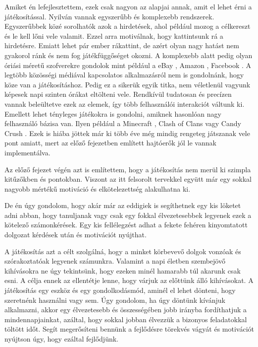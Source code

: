 


Amiket én lefejlesztettem, ezek csak nagyon az alapjai annak, amit el lehet érni a játékosítással. Nyilván vannak egyszerűbb és komplexebb rendszerek. Egyszerűbbek közé sorolhatók azok a hirdetések, ahol például mozog a célkereszt és le kell lőni vele valamit. Ezzel arra motiválnak, hogy kattintsunk rá a hirdetésre. Emiatt lehet pár ember rákattint, de azért olyan nagy hatást nem gyakorol ránk és nem fog játékfüggőséget okozni. A komplexebb alatt pedig olyan óriási méretű szofverekre gondolok mint például a eBay \cite{ebay}, Amazon \cite{amazon}, Facebook \cite{facebook}. A legtöbb közösségi médiával kapcsolatos alkalmazásról nem is gondolnánk, hogy köze van a játékosításhoz. Pedig ez a sikerük egyik titka, nem véletlenül vagyunk képesek napi szinten órákat eltölteni vele. Rendkívül tudatosan és precízen vannak beleültetve ezek az elemek, így több felhasználói interakciót váltunk ki. Emellett lehet tényleges játékokra is gondolni, amiknek hasonlóan nagy felhasználó bázisa van. Ilyen például a Minecraft \cite{minecraft}, Clash of Clans \cite{clashOfClans} vagy Candy Crush \cite{candycrush}. Ezek is hiába jöttek már ki több éve még mindig rengeteg játszanak vele pont amiatt, mert az előző fejezetben említett hajtóerők jól le vannak implementálva. \newline

Az előző fejezet végén azt is említettem, hogy a játékosítás nem merül ki szimpla kitűzőkben és pontokban. Viszont az itt felsorolt tervekkel együtt már egy sokkal nagyobb mértékű motiváció és elkötelezettség alakulhatna ki. \newline

De én úgy gondolom, hogy akár már az eddigiek is segíthetnek egy kis löketet adni abban, hogy tanuljanak vagy csak egy fokkal élvezetesebbek legyenek ezek a kötelező számonkérések. Egy kis fellélegzést adhat a fekete fehéren kinyomtatott dolgozat kérdések után és motivációt nyújthat. \newline

A játékosítás azt a célt szolgálná, hogy a minket körbevevő dolgok vonzóak és szórakoztatóak legyenek számunkra. Valamint a napi életben szembejövő kihívásokra ne úgy tekintsünk, hogy ezeken minél hamarabb túl akarunk csak esni. A célja ennek az ellentétje lenne, hogy várjuk az előttünk álló kihívásokat. A játékosítás egy eszköz és egy gondolkodásmód, aminél el lehet dönteni, hogy szeretnénk használni vagy sem. Úgy gondolom, ha úgy döntünk kívánjuk alkalmazni, akkor egy élvezetesebb és összességében jobb irányba fordíthatjuk a mindennapjainkat, azáltal, hogy sokkal jobban élvezzük a bizonyos feladatokkal töltött időt. Segít megerősíteni bennünk a fejlődésre törekvés vágyát és motivációt nyújtson úgy, hogy ezáltal fejlődjünk.